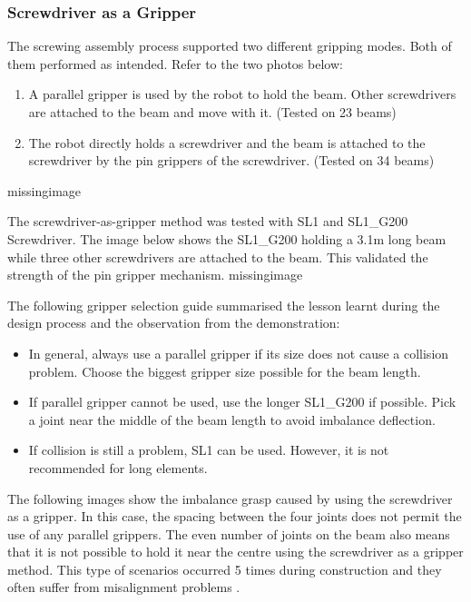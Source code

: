 \subsubsection{Screwdriver as a Gripper}
\label{subsubsection:exploration_4_screwdriver_as_a_gripper}

The screwing assembly process supported two different gripping modes. Both of them performed as intended. Refer to the two photos below:
\begin{enumerate}
    \item A parallel gripper is used by the robot to hold the beam. Other screwdrivers are attached to the beam and move with it. (Tested on 23 beams)
    \item The robot directly holds a screwdriver and the beam is attached to the screwdriver by the pin grippers of the screwdriver.  (Tested on 34 beams)
\end{enumerate}
missingimage

The screwdriver-as-gripper method was tested with SL1 and SL1\_G200 Screwdriver. The image below shows the SL1\_G200 holding a 3.1m long beam while three other screwdrivers are attached to the beam. This validated the strength of the pin gripper mechanism.
missingimage

The following gripper selection guide summarised the lesson learnt during the design process and the observation from the demonstration:
\begin{itemize}
    \item In general, always use a parallel gripper if its size does not cause a collision problem. Choose the biggest gripper size possible for the beam length.
    \item If parallel gripper cannot be used, use the longer SL1\_G200 if possible. Pick a joint near the middle of the beam length to avoid imbalance deflection.
    \item If collision is still a problem, SL1 can be used. However, it is not recommended for long elements.
\end{itemize}
The following images show the imbalance grasp caused by using the screwdriver as a gripper. In this case, the spacing between the four joints does not permit the use of any parallel grippers. The even number of joints on the beam also means that it is not possible to hold it near the centre using the screwdriver as a gripper method. This type of scenarios occurred 5 times during construction and they often suffer from misalignment problems .

